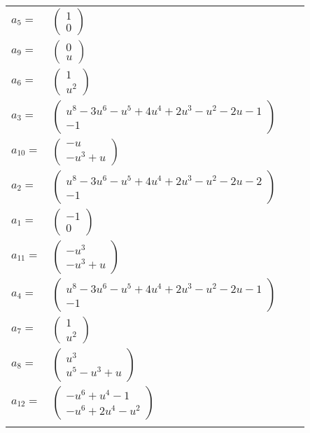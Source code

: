 \documentclass[1p]{elsarticle_modified}
\theoremstyle{definition}
\begin{document}
\begin{tabular}{m{7pt} m{180pt} m{7pt} m{180pt} }
\flushright $a_{5}=$&$\begin{pmatrix}1\\0\end{pmatrix}$ \\
\flushright $a_{9}=$&$\begin{pmatrix}0\\u\end{pmatrix}$ \\
\flushright $a_{6}=$&$\begin{pmatrix}1\\u^2\end{pmatrix}$ \\
\flushright $a_{3}=$&$\begin{pmatrix}u^8-3 u^6- u^5+4 u^4+2 u^3- u^2-2 u-1\\-1\end{pmatrix}$ \\
\flushright $a_{10}=$&$\begin{pmatrix}- u\\- u^3+u\end{pmatrix}$ \\
\flushright $a_{2}=$&$\begin{pmatrix}u^8-3 u^6- u^5+4 u^4+2 u^3- u^2-2 u-2\\-1\end{pmatrix}$ \\
\flushright $a_{1}=$&$\begin{pmatrix}-1\\0\end{pmatrix}$ \\
\flushright $a_{11}=$&$\begin{pmatrix}- u^3\\- u^3+u\end{pmatrix}$ \\
\flushright $a_{4}=$&$\begin{pmatrix}u^8-3 u^6- u^5+4 u^4+2 u^3- u^2-2 u-1\\-1\end{pmatrix}$ \\
\flushright $a_{7}=$&$\begin{pmatrix}1\\u^2\end{pmatrix}$ \\
\flushright $a_{8}=$&$\begin{pmatrix}u^3\\u^5- u^3+u\end{pmatrix}$ \\
\flushright $a_{12}=$&$\begin{pmatrix}- u^6+u^4-1\\- u^6+2 u^4- u^2\end{pmatrix}$\\&\end{tabular}
\end{document}
